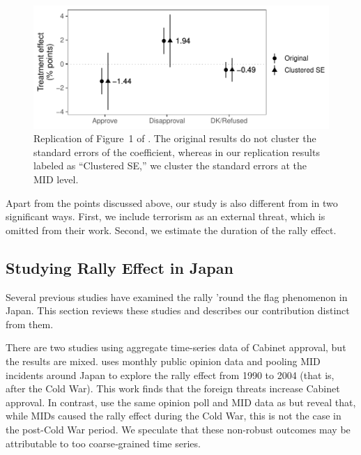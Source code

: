 \documentclass[12pt,letterpaper]{scrartcl}
\begin{document}
\begin{figure}[!ht]
  \includegraphics[width = \linewidth]{Figure_JCR/Figure_1_revised.pdf}
  \caption{Replication of Figure~1 of \citet{seo2023}. The original results do not cluster the standard errors of the coefficient, whereas in our replication results labeled as ``Clustered SE,'' we cluster the standard errors at the MID level.}\label{app:fig:replication}
\end{figure}

Apart from the points discussed above, our study is also different from \citet{seo2023} in two significant ways. First, we include terrorism as an external threat, which is omitted from their work. Second, we estimate the duration of the rally effect.

\subsection{Studying Rally Effect in Japan}\label{app:subsec:rally_japan}

Several previous studies have examined the rally 'round the flag phenomenon in Japan. This section reviews these studies and describes our contribution distinct from them.

There are two studies using aggregate time-series data of Cabinet approval, but the results are mixed. \citet{kagotani2015} uses monthly public opinion data and pooling MID incidents around Japan to explore the rally effect from 1990 to 2004 (that is, after the Cold War). This work finds that the foreign threats increase Cabinet approval. In contrast, \citet{Ohmura2014Leviathan} use the same opinion poll and MID data as \citet{kagotani2015} but reveal that, while MIDs caused the rally effect during the Cold War, this is not the case in the post-Cold War period. We speculate that these non-robust outcomes may be attributable to too coarse‐grained time series.
\end{document}
